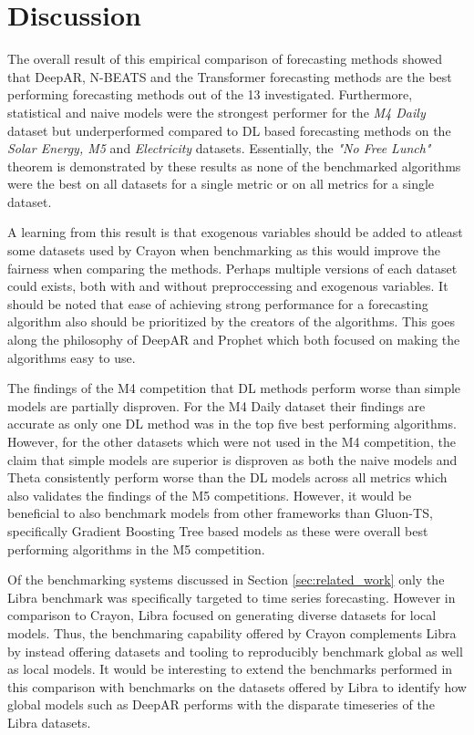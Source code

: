 \section{Discussion}
The overall result of this empirical comparison of forecasting methods showed that DeepAR, N-BEATS and the Transformer forecasting methods are the best performing forecasting methods out of the 13 investigated. Furthermore, statistical and naive models were the strongest performer for the \textit{M4 Daily} dataset but underperformed compared to DL based forecasting methods on the \textit{Solar Energy, M5} and \textit{Electricity} datasets. Essentially, the \textit{"No Free Lunch"} theorem is demonstrated by these results as none of the benchmarked algorithms were the best on all datasets for a single metric or on all metrics for a single dataset.

A learning from this result is that exogenous variables should be added to atleast some datasets used by Crayon when benchmarking as this would improve the fairness when comparing the methods. Perhaps multiple versions of each dataset could exists, both with and without preproccessing and exogenous variables. It should be noted that ease of achieving strong performance for a forecasting algorithm also should be prioritized by the creators of the algorithms. This goes along the philosophy of DeepAR and Prophet which both focused on making the algorithms easy to use.

The findings of the M4 competition that DL methods perform worse than simple models are partially disproven. For the M4 Daily dataset their findings are accurate as only one DL method was in the top five best performing algorithms. However, for the other datasets which were not used in the M4 competition, the claim that simple models are superior is disproven as both the naive models and Theta consistently perform worse than the DL models across all metrics which also validates the findings of the M5 competitions. However, it would be beneficial to also benchmark models from other frameworks than Gluon-TS, specifically Gradient Boosting Tree based models as these were overall best performing algorithms in the M5 competition.

Of the benchmarking systems discussed in Section \ref{sec:related_work} only the Libra benchmark was specifically targeted to time series forecasting. However in comparison to Crayon, Libra focused on generating diverse datasets for local models. Thus, the benchmaring capability offered by Crayon complements Libra by instead offering datasets and tooling to reproducibly benchmark global as well as local models. It would be interesting to extend the benchmarks performed in this comparison with benchmarks on the datasets offered by Libra to identify how global models such as DeepAR performs with the disparate timeseries of the Libra datasets.

